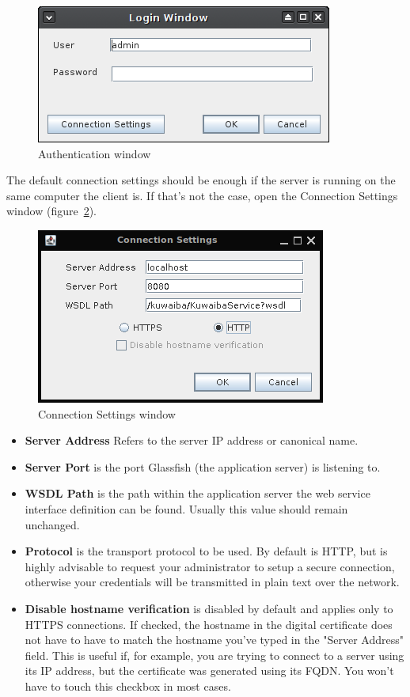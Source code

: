 \documentclass[a4paper]{article}
\begin{document}
	\begin{figure}[h!]
		\centering
		\includegraphics[width=0.5\linewidth]{img/auth_window.png}
		\caption{Authentication window}
		\label{fig:auth_window}
	\end{figure}
	The default connection settings should be enough if the server is running on the same computer the client is. If that's not the case, open the Connection Settings window (figure~\ref{fig:connection_settings}).
	\begin{figure}[h!]
		\centering
		\includegraphics[width=0.5\linewidth]{img/connection_settings.png}
		\caption{Connection Settings window}
		\label{fig:connection_settings}
	\end{figure}
	\begin{itemize}
		\item \textbf{Server Address} Refers to the server IP address or canonical name.
		\item \textbf{Server Port} is the port Glassfish (the application server) is listening to.
		\item \textbf{WSDL Path} is the path within the application server the web service interface definition can be found. Usually this value should remain unchanged.
		\item \textbf{Protocol} is the transport protocol to be used. By default is HTTP, but is highly advisable to request your administrator to setup a secure connection, otherwise your credentials will be transmitted in plain text over the network.
		\item \textbf{Disable hostname verification} is disabled by default and applies only to HTTPS connections. If checked, the hostname in the digital certificate does not have to have to match the hostname you've typed in the "Server Address" field. This is useful if, for example, you are trying to connect to a server using its IP address, but the certificate was generated using its FQDN. You won't have to touch this checkbox in most cases.
	\end{itemize}
\end{document}
